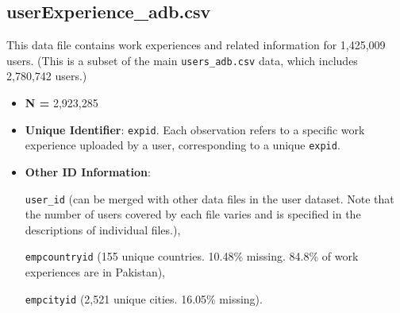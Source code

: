 \documentclass[12pt]{article}
\begin{document}
\subsection{userExperience\_adb.csv}
This data file contains work experiences and related information for 1,425,009 users. (This is a subset of the main \texttt{users\_adb.csv} data, which includes 2,780,742 users.)

\begin{itemize}
    \item \textbf{N = }2,923,285
    \item \textbf{Unique Identifier}: \texttt{expid}. Each observation refers to a specific work experience uploaded by a user, corresponding to a unique \texttt{expid}.
    \item \textbf{Other ID Information}: 
    
    \texttt{user\_id} (can be merged with other data files in the user dataset. Note that the number of users covered by each file varies and is specified in the descriptions of individual files.),
    
    \texttt{empcountryid} (155 unique countries. 10.48\% missing. 84.8\% of work experiences are in Pakistan), 
    
    \texttt{empcityid} (2,521 unique cities. 16.05\% missing).
    \end{itemize}
\end{document}
